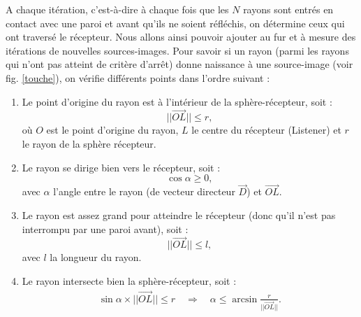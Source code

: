 A chaque itération, c'est-à-dire à chaque fois que les $N$ rayons sont entrés en contact avec une paroi et avant qu'ils ne soient réfléchis, on détermine ceux qui ont traversé le récepteur. Nous allons ainsi pouvoir ajouter au fur et à mesure des itérations de nouvelles sources-images. Pour savoir si un rayon (parmi les rayons qui n'ont pas atteint de critère d'arrêt) donne naissance à une source-image (voir fig. \ref{touche}), on vérifie différents points dans l'ordre suivant :

\begin{enumerate}
\item Le point d'origine du rayon est à l'intérieur de la sphère-récepteur, soit :
	\begin{equation}
		||\overrightarrow{OL}|| \leqslant r,
	\end{equation}
où $O$ est le point d'origine du rayon, $L$ le centre du récepteur (Listener) et $r$ le rayon de la sphère récepteur.
\item Le rayon se dirige bien vers le récepteur, soit :
	\begin{equation}
		\cos{\alpha} \geqslant 0,
	\end{equation}
avec $\alpha$ l'angle entre le rayon (de vecteur directeur $\overrightarrow{D}$) et $\overrightarrow{OL}$.
\item Le rayon est assez grand pour atteindre le récepteur (donc qu'il n'est pas interrompu par une paroi avant), soit :
%
\begin{equation}
||\overrightarrow{OL}|| \leqslant l,
\end{equation}
%
avec $l$ la longueur du rayon.
\item Le rayon intersecte bien la sphère-récepteur, soit :
%
\begin{align}
\sin{\alpha} \times ||\overrightarrow{OL}||  \leqslant r 
\quad \Rightarrow \quad
\alpha  \leqslant \arcsin{\frac{r}{||\overrightarrow{OL}||}}.
\end{align}
%
\end{enumerate}
%
%
